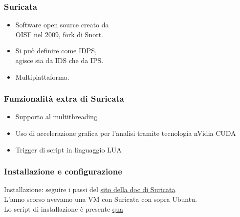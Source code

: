 \documentclass[aspectratio=169]{beamer}
\begin{document}
	\begin{frame}
        \frametitle{Suricata}
        \begin{itemize}
            \item Software open source creato da\\OISF nel 2009, fork di Snort.
            \item Si può definire come IDPS,\\agisce sia da IDS che da IPS.
            \item Multipiattaforma.
        \end{itemize}
        
    \end{frame}
	\begin{frame}
    	\frametitle{Funzionalità extra di Suricata}
        \begin{itemize}
            \item Supporto al multithreading
            \item Uso di accelerazione grafica per l'analisi tramite tecnologia nVidia CUDA
            \item Trigger di script in linguaggio LUA
        \end{itemize}
      
    \end{frame}
 
    \begin{frame}
    	\frametitle{Installazione e configurazione}
		Installazione: seguire i passi del \href{https://suricata.readthedocs.io/en/suricata-6.0.4/quickstart.html\#installation}{sito della doc di Suricata}
        \\
        L'anno scorso avevamo una VM con Suricata con sopra Ubuntu.
        \\
        Lo script di installazione è presente \href{https://git.fuo.fi/fuomag9/docker-stuff-ipv6-ad/-/blob/main/scripts/install_suricata.sh}{qua}
    \end{frame}
    
\end{document}
